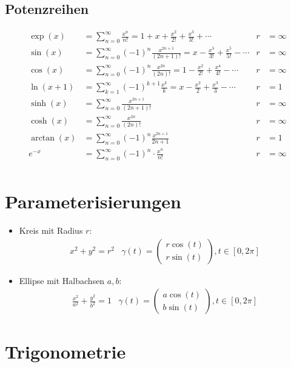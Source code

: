 \documentclass[a4paper,10pt]{article}
\def\sumk{\sum_{k=1}^\infty}
\def\sumn{\sum_{n=0}^\infty}
\begin{document}
\subsection{Potenzreihen}
\begin{align*}
\exp(x) &= \sumn \frac{x^n}{n!} = 1 + x + \frac{x^2}{2!} + \frac{x^3}{3!} + \cdots & r &= \infty \\
\sin(x) &= \sumn (-1)^n \frac{x^{2n + 1}}{(2n + 1)!} = x - \frac{x^3}{3!} + \frac{x^5}{5!} - \cdots & r &= \infty \\
\cos(x) &= \sumn (-1)^n \frac{x^{2n}}{(2n)!} = 1 - \frac{x^2}{2!} + \frac{x^4}{4!} - \cdots & r &= \infty \\
\ln(x + 1) &= \sumk (-1)^{k+1} \frac{x^k}{k} = x - \frac{x^2}{2} + \frac{x^3}{3} - \cdots & r &= 1 \\
\sinh(x) &= \sumn \frac{x^{2n+1}}{(2n+1)!} & r &= \infty \\
\cosh(x) &= \sumn \frac{x^{2n}}{(2n)!} & r &= \infty \\
\arctan(x) &= \sumn (-1)^n \frac{x^{2n+1}}{2n+1} & r &= 1 \\
e^{-x} &= \sumn (-1)^n \cdot \frac{x^n}{n!} & r &= \infty \\
\end{align*}

\section{Parameterisierungen}

\begin{itemize}
  \item Kreis mit Radius $r$:{
    \begin{align*} 
      & x^2 + y^2 = r^2 & \gamma(t) = \begin{pmatrix} r \cos(t) \\ r \sin(t) \end{pmatrix}, t \in [0, 2\pi] &
    \end{align*}
  }
  \item Ellipse mit Halbachsen $a, b$:{
    \begin{align*} 
      & \frac{x^2}{a^2} + \frac{y^2}{b^2} = 1 & \gamma(t) = \begin{pmatrix} a \cos(t) \\ b \sin(t) \end{pmatrix}, t \in [0, 2\pi] &
    \end{align*}
  }
\end{itemize}

\section{Trigonometrie}
\end{document}
